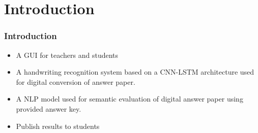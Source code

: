 \section{Introduction} 

\begin{frame}
\frametitle{Introduction}
\begin{itemize}
    \item A GUI for teachers and students
    \item A handwriting recognition system based on a CNN-LSTM architecture used for digital conversion of answer paper.
    \item A NLP model used for semantic evaluation of digital answer paper using provided answer key.
    \item Publish results to students
\end{itemize}
\end{frame}
